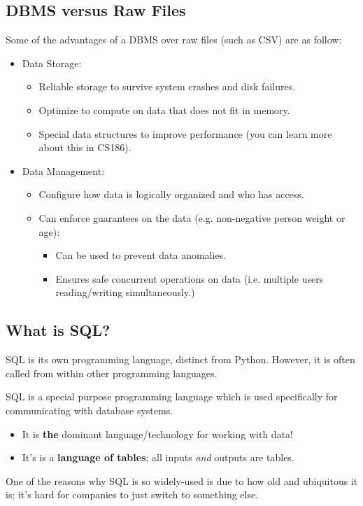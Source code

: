 \documentclass[openany]{book}
\begin{document}
\subsection{DBMS versus Raw Files}
Some of the advantages of a DBMS over raw files (such as CSV) are as follow:
\begin{itemize}
	\item Data Storage:
	\begin{itemize}
		\item Reliable storage to survive system crashes and disk failures.
		\item Optimize to compute on data that does not fit in memory.
		\item Special data structures to improve performance (you can learn more about this in CS186).
	\end{itemize}
	\item Data Management:
	\begin{itemize}
		\item Configure how data is logically organized and who has access.
		\item Can enforce guarantees on the data (e.g. non-negative person weight or age):
		\begin{itemize}
			\item Can be used to prevent data anomalies.
			\item Ensures safe concurrent operations on data (i.e. multiple users reading/writing simultaneously.)
		\end{itemize}
	\end{itemize}
\end{itemize}

\subsection{What is SQL?}
SQL is its own programming language, distinct from Python. However, it is often called from within other programming languages.

SQL is a special purpose programming language which is used specifically for communicating with database systems.
\begin{itemize}
	\item It is \textbf{the} dominant language/technology for working with data!
	\item It's is a \textbf{language of tables}; all inputs \textit{and} outputs are tables.
\end{itemize}

\begin{rmk}
	One of the reasons why SQL is so widely-used is due to how old and ubiquitous it is; it's hard for companies to just switch to something else.
\end{rmk}
\end{document}
